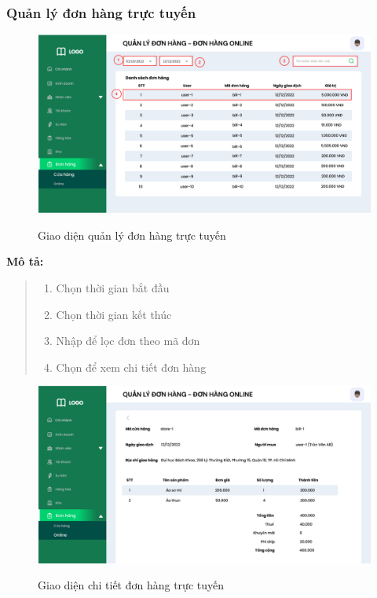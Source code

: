     \newpage   
        
    \subsubsection{Quản lý đơn hàng trực tuyến}
    \begin{figure}[!htp]
        \centering
        \includegraphics[width=12cm]{img/UI/admin/OnlineOrder.png}
        \label{40}
        \newline
        \caption{Giao diện quản lý đơn hàng trực tuyến}
    \end{figure}
    \textbf{Mô tả:}  
    \begin{quote}
        \begin{enumerate}
            \item Chọn thời gian bắt đầu
            \item Chọn thời gian kết thúc
            \item Nhập để lọc đơn theo mã đơn
            \item Chọn để xem chi tiết đơn hàng
        \end{enumerate}
    \end{quote}
    
        \begin{figure}[!htp]
            \centering
            \includegraphics[width=12cm]{img/UI/admin/OnlineOrder_detail.png}
            \label{41}
            \newline
            \caption{Giao diện chi tiết đơn hàng trực tuyến}
        \end{figure}
    
